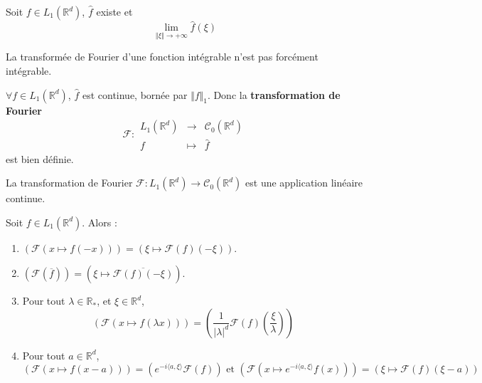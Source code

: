   \begin{lemma}
    Soit $f \in L_1(\mathbb{R}^d)$, $\widehat{f}$ existe et
    \[ \lim_{\Vert \xi \Vert \rightarrow +\infty} \widehat{f}(\xi) \]
  \end{lemma}

  \begin{remark}
    La transformée de Fourier d'une fonction intégrable n'est pas forcément intégrable.
  \end{remark}

  \begin{theorem}
    $\forall f \in L_1(\mathbb{R}^d)$, $\widehat{f}$ est continue, bornée par $\Vert f \Vert_1$. Donc la \textbf{transformation de Fourier}
    \[
    \mathcal{F} :
    \begin{array}{ccc}
      L_1(\mathbb{R}^d) &\rightarrow& \mathcal{C}_0(\mathbb{R}^d) \\
      f &\mapsto& \widehat{f}
    \end{array}
    \]
    est bien définie.
  \end{theorem}

  \begin{corollary}
    La transformation de Fourier $\mathcal{F} : L_1(\mathbb{R}^d) \rightarrow \mathcal{C}_0(\mathbb{R}^d)$ est une application linéaire continue.
  \end{corollary}

  \begin{proposition}
    Soit $f \in L_1(\mathbb{R}^d)$. Alors :
    \begin{enumerate}[label=(\roman*)]
      \item $(\mathcal{F}(x \mapsto f(-x))) = (\xi \mapsto \mathcal{F}(f)(-\xi))$.
      \item $(\mathcal{F}(\overline{f})) = (\xi \mapsto \overline{\mathcal{F}(f)(-\xi)})$.
      \item Pour tout $\lambda \in \mathbb{R}_*$, et $\xi \in \mathbb{R}^d$,
      \[ (\mathcal{F}(x \mapsto f(\lambda x))) = (\frac{1}{\vert \lambda \vert^d} \mathcal{F}(f) \left( \frac{\xi}{\lambda} \right)) \]
      \item Pour tout $a \in \mathbb{R}^d$,
      \[ (\mathcal{F}(x \mapsto f(x - a))) = (e^{-i \langle a, \xi \rangle} \mathcal{F}(f)) \text{ et } (\mathcal{F}(x \mapsto e^{-i \langle a, \xi \rangle} f(x))) = (\xi \mapsto \mathcal{F}(f)(\xi - a)) \]
    \end{enumerate}
  \end{proposition}


